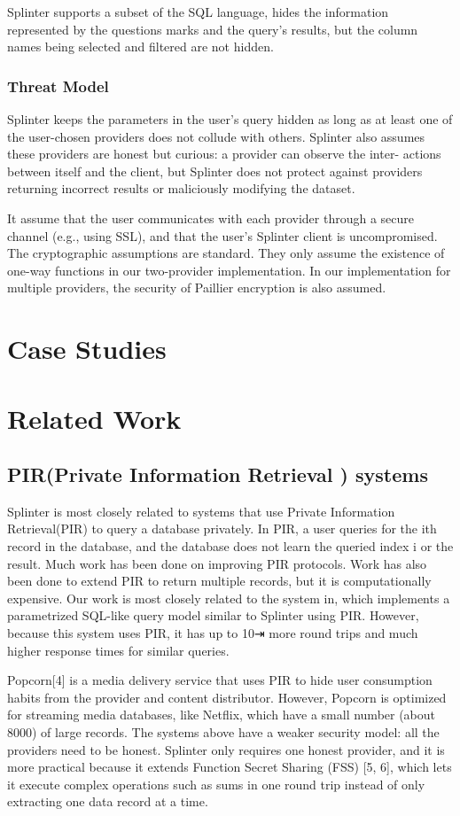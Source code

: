 \documentclass[12pt,a4paper]{article}
\begin{document}
\begin{multicols}{2}
Splinter supports a subset of the SQL language, 
hides the information represented by the questions 
marks and the query’s results, but the column names 
being selected and filtered are not hidden.
\subsubsection{Threat Model}
Splinter keeps the parameters in the user’s query 
hidden as long as at least one of the user-chosen 
providers does not collude with others. Splinter 
also assumes these providers are honest but 
curious: a provider can observe the inter- actions 
between itself and the client, but Splinter does 
not protect against providers returning incorrect 
results or maliciously modifying the dataset.

It assume that the user communicates with each 
provider through a secure channel (e.g., using 
SSL), and that the user’s Splinter client is 
uncompromised. The cryptographic assumptions are 
standard. They only assume the existence of one-way 
functions in our two-provider implementation. In 
our implementation for multiple providers, the 
security of Paillier encryption is also 
assumed.

\section{Case Studies}
\section{Related Work}
\subsection{PIR(Private Information Retrieval ) 
systems}
Splinter is most closely related to systems that 
use Private Information Retrieval(PIR) to query a 
database privately. In PIR, a user queries for the 
ith record in the database, and the database does 
not learn the queried index i or the result. Much 
work has been done on improving PIR protocols. Work 
has also been done to extend PIR to return multiple 
records, but it is computationally expensive. Our 
work is most closely related to the system in, 
which implements a parametrized SQL-like query 
model similar to Splinter using PIR. However, 
because this system uses PIR, it has up to 10⇥ more 
round trips and much higher response times for 
similar queries.

Popcorn[4] is a media delivery service that uses 
PIR to hide user consumption habits from the 
provider and content distributor. However, Popcorn 
is optimized for streaming media databases, like 
Netflix, which have a small number (about 8000) of 
large records.
The systems above have a weaker security model: all
the providers need to be honest. Splinter only 
requires one honest provider, and it is more 
practical because it extends Function Secret 
Sharing (FSS) [5, 6], which lets it execute 
complex operations such as sums in one round trip 
instead of only extracting one data record at a 
time.

\end{multicols}
\end{document}
